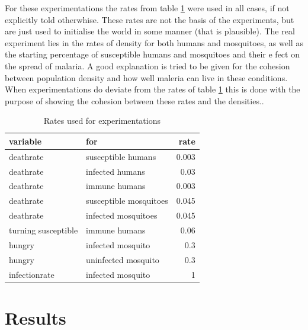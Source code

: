 \documentclass[a4paper]{report}
\begin{document}
For these experimentations the rates from table \ref{tab:rates} were used in all
cases, if not explicitly told otherwhise. These rates are not the basis of the
experiments, but are just used to initialise the world in some manner (that is
plausible). The real experiment lies in the rates of density for both
humans and mosquitoes, as well as the starting percentage of susceptible
humans and mosquitoes and their e fect on the spread of malaria. A good
explanation  is 
tried to be given for the cohesion between population density and how well maleria can live in these conditions.
When experimentations do deviate from the rates of table \ref{tab:rates} this is
done with the purpose of showing the cohesion between these rates and the
densities..

\begin{table}
\centering
\begin{tabular}{|l|l|r|}
        \hline
        variable&for&rate\\
        \hline
        deathrate&susceptible humans &0.003\\
        deathrate&infected humans&0.03\\
        deathrate&immune humans&0.003\\
        deathrate&susceptible mosquitoes&0.045\\
        deathrate&infected mosquitoes&0.045\\
        turning susceptible&immune humans& 0.06\\
        hungry&infected mosquito  & 0.3\\
        hungry&uninfected mosquito& 0.3\\
        infectionrate&infected mosquito& 1\\
        \hline
\end{tabular}
\caption{Rates used for experimentations }
\label{tab:rates}
\end{table}

\section{Results}
\end{document}
